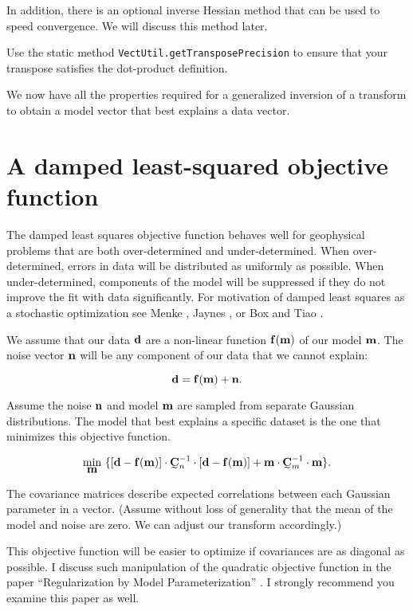 \documentclass[12pt]{article}
\begin{document}
\noindent In addition, there is an optional
inverse Hessian method that can be used to
speed convergence.  We will discuss this
method later.

Use the static method
\texttt{VectUtil.getTransposePrecision} to
ensure that your transpose satisfies the
dot-product definition.

We now have all the properties required for a
generalized inversion of a transform to
obtain a model vector that best explains a
data vector.

\section {A damped least-squared objective
function}

The damped least squares objective function
behaves well for geophysical problems that
are both over-deter\-mined and
under-deter\-mined.  When over-deter\-mined,
errors in data will be distributed as
uniformly as possible.  When
under-deter\-mined, components of the model
will be suppressed if they do not improve the
fit with data significantly.  For motivation
of damped least squares as a stochastic
optimization see Menke \cite{menke}, Jaynes
\cite{jaynes}, or Box and Tiao
\cite{boxandtiao}.

We assume that our data ${{\mbox{\boldmath $\bf d$}}}$ are a
non-linear function ${{\mbox{\boldmath $\bf f$}}}({{\mbox{\boldmath $\bf m$}}})$ of our model
${{\mbox{\boldmath $\bf m$}}}$.  The noise vector ${{\mbox{\boldmath $\bf n$}}}$ will be any
component of our data that we cannot explain:

\begin{equation}
{{\mbox{\boldmath $\bf d$}}} = {{\mbox{\boldmath $\bf f$}}} ( {{\mbox{\boldmath $\bf m$}}} ) + {{\mbox{\boldmath $\bf n$}}}.  
\end{equation}

\noindent Assume the noise ${{\mbox{\boldmath $\bf n$}}}$ and model
${{\mbox{\boldmath $\bf m$}}}$ are sampled from separate Gaussian
distributions.  The model that best explains
a specific dataset is the one that minimizes
this objective function.

\begin{equation}
\label{eq:obj}
\min_{\mv} ~ \{ [\dv - \fv (\mv) ] \cdot \Cni \cdot [\dv - \fv (\mv) ]
            + \mv \cdot \Cmi \cdot \mv \} .
\end{equation}

\noindent The covariance matrices describe
expected correlations between each Gaussian
parameter in a vector.  (Assume without loss
of generality that the mean of the model and
noise are zero.  We can adjust our transform
accordingly.)

This objective function will be easier to
optimize if covariances are as diagonal as
possible.  I discuss such manipulation of the
quadratic objective function in the paper
``Regularization by Model Parameterization''
\cite{harlan-model}.  I strongly recommend
you examine this paper as well.
\end{document}
